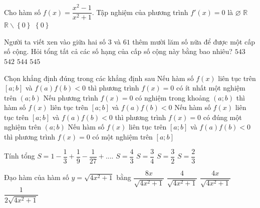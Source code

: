 \begin{ex}%
	Cho hàm số $f(x)=\dfrac{x^2-1}{x^2+1}$. Tập nghiệm của phương trình $f'(x)=0$ là
	\choice
	{$\varnothing$}
	{$\mathbb{R}$}
	{$\mathbb{R}\backslash\left\{0\right\}$}
	{\True $\left\{0\right\}$}
\end{ex}

\begin{ex}%
	Người ta viết xen vào giữa hai số $3$ và $61$ thêm mười lăm số nữa để được một cấp số cộng. Hỏi tổng tất cả các số hạng của cấp số cộng này bằng bao nhiêu?
	\choice
	{$543$}
	{$542$}
	{\True $544$}
	{$545$}
\end{ex}

\begin{ex}%
	Chọn khẳng định đúng trong các khẳng định sau
	\choice
	{\True Nếu hàm số $f(x)$ liên tục trên $[a;b]$ và $f(a)f(b)<0$ thì phương trình $f(x)=0$ có ít nhất một nghiệm trên $(a;b)$}
	{Nếu phương trình $f(x)=0$ có nghiệm trong khoảng $(a;b)$ thì hàm số $f(x)$ liên tục trên $[a;b]$ và $f(a)f(b)<0$}
	{Nếu hàm số $f(x)$ liên tục trên $[a;b]$ và $f(a)f(b)<0$ thì phương trình $f(x)=0$ có đúng một nghiệm trên $(a;b)$}
	{Nếu hàm số $f(x)$ liên tục trên $[a;b]$ và $f(a)f(b)<0$ thì phương trình $f(x)=0$ có một nghiệm trên $[a;b]$}
\end{ex}

\begin{ex}%
	Tính tổng $S=1-\dfrac{1}{3}+\dfrac{1}{9}-\dfrac{1}{27}+...$.
	\choice
	{$S=\dfrac{4}{3}$}
	{\True $S=\dfrac{3}{4}$}
	{$S=\dfrac{3}{2}$}
	{$S=\dfrac{2}{3}$}
\end{ex}

\begin{ex}%
	Đạo hàm của hàm số $y=\sqrt{4x^2+1}$ bằng
	\choice
	{$\dfrac{8x}{\sqrt{4x^2+1}}$}
	{$\dfrac{4}{\sqrt{4x^2+1}}$}
	{\True $\dfrac{4x}{\sqrt{4x^2+1}}$}
	{$\dfrac{1}{2\sqrt{4x^2+1}}$}
\end{ex}


